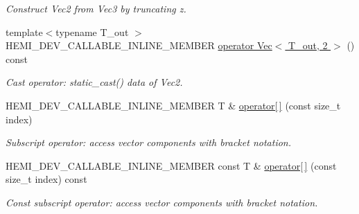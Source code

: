 \begin{DoxyCompactItemize}
\begin{DoxyCompactList}\small\item\em Construct Vec2 from Vec3 by truncating z. \end{DoxyCompactList}\item 
\hypertarget{structVec_3_01T_00_012_01_4_a30c6261be3fb6aa343df595bd94cb8a9}{}{\footnotesize template$<$typename T\+\_\+out $>$ }\\H\+E\+M\+I\+\_\+\+D\+E\+V\+\_\+\+C\+A\+L\+L\+A\+B\+L\+E\+\_\+\+I\+N\+L\+I\+N\+E\+\_\+\+M\+E\+M\+B\+E\+R \hyperlink{structVec_3_01T_00_012_01_4_a30c6261be3fb6aa343df595bd94cb8a9}{operator Vec$<$ T\+\_\+out, 2 $>$} () const \label{structVec_3_01T_00_012_01_4_a30c6261be3fb6aa343df595bd94cb8a9}

\begin{DoxyCompactList}\small\item\em Cast operator\+: static\+\_\+cast() data of Vec2. \end{DoxyCompactList}\item 
H\+E\+M\+I\+\_\+\+D\+E\+V\+\_\+\+C\+A\+L\+L\+A\+B\+L\+E\+\_\+\+I\+N\+L\+I\+N\+E\+\_\+\+M\+E\+M\+B\+E\+R T \& \hyperlink{structVec_3_01T_00_012_01_4_acd3229385a54855ca6b6ba1b94ba7bd0}{operator\mbox{[}$\,$\mbox{]}} (const size\+\_\+t index)
\begin{DoxyCompactList}\small\item\em Subscript operator\+: access vector components with bracket notation. \end{DoxyCompactList}\item 
H\+E\+M\+I\+\_\+\+D\+E\+V\+\_\+\+C\+A\+L\+L\+A\+B\+L\+E\+\_\+\+I\+N\+L\+I\+N\+E\+\_\+\+M\+E\+M\+B\+E\+R const T \& \hyperlink{structVec_3_01T_00_012_01_4_af11a9d4e21ebcdbae1c35b754a22e69b}{operator\mbox{[}$\,$\mbox{]}} (const size\+\_\+t index) const 
\begin{DoxyCompactList}\small\item\em Const subscript operator\+: access vector components with bracket notation. \end{DoxyCompactList}\end{DoxyCompactItemize}
